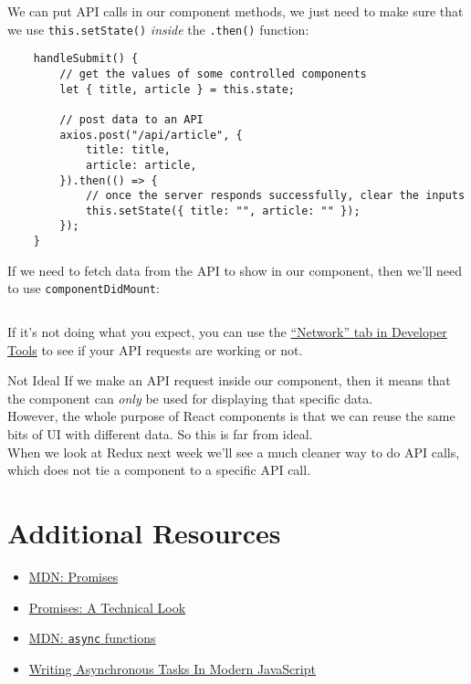 We can put API calls in our component methods, we just need to make sure that we use \texttt{this.setState()} \textit{inside} the \texttt{.then()} function:

\begin{verbatim}
    handleSubmit() {
        // get the values of some controlled components
        let { title, article } = this.state;

        // post data to an API
        axios.post("/api/article", {
            title: title,
            article: article,
        }).then(() => {
            // once the server responds successfully, clear the inputs
            this.setState({ title: "", article: "" });
        });
    }
\end{verbatim}

If we need to fetch data from the API to show in our component, then we'll need to use \texttt{componentDidMount}:

\inputminted{js}{04-async/figures/01-Articles.js}

If it's not doing what you expect, you can use the \href{https://developer.mozilla.org/en-US/docs/Tools/Network_Monitor}{``Network'' tab in Developer Tools} to see if your API requests are working or not.

\begin{infobox}{Not Ideal}
    If we make an API request inside our component, then it means that the component can \textit{only} be used for displaying that specific data.
    \\

    However, the whole purpose of React components is that we can reuse the same bits of UI with different data. So this is far from ideal.
    \\

    When we look at Redux next week we'll see a much cleaner way to do API calls, which does not tie a component to a specific API call.
\end{infobox}

\section{Additional Resources}

\begin{itemize}[leftmargin=*]
    \item \href{https://developer.mozilla.org/en-US/docs/Web/JavaScript/Reference/Global_Objects/Promise}{MDN: Promises}
    \item \href{http://exploringjs.com/es6/ch_promises.html}{Promises: A Technical Look}
    \item \href{https://developer.mozilla.org/en-US/docs/Web/JavaScript/Reference/Statements/async_function}{MDN: \texttt{async} functions}
    \item \href{https://www.smashingmagazine.com/2019/10/asynchronous-tasks-modern-javascript/}{Writing Asynchronous Tasks In Modern JavaScript}
\end{itemize}
